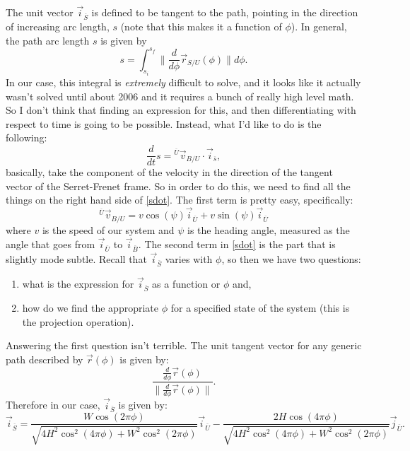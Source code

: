 \documentclass[12pt]{article}
\newcommand{\unitvec}[2]{\vec{#1}_{\overline{#2}}}
\begin{document}
The unit vector $\unitvec{i}{S}$ is defined to be tangent to the path, pointing in the direction of increasing arc length, $s$ (note that this makes it a function of $\phi$).  In general, the path arc length $s$ is given by
\begin{equation}
s=\int_{s_i}^{s_f}\| \frac{d}{d\phi}\vec{r}_{S/U}(\phi)\| d\phi.
\end{equation}
In our case, this integral is \emph{extremely} difficult to solve, and it looks like it actually wasn't solved until about 2006 and it requires a bunch of really high level math.  So I don't think that finding an expression for this, and then differentiating with respect to time is going to be possible.  Instead, what I'd like to do is the following:
\begin{equation}\label{sdot}
\frac{d}{dt}s = {}^{\overline{U}}\vec{v}_{B/U}\cdot \unitvec{i}{s},
\end{equation}
basically, take the component of the velocity in the direction of the tangent vector of the Serret-Frenet frame.  So in order to do this, we need to find all the things on the right hand side of \ref{sdot}.  The first term is pretty easy, specifically:
\begin{equation}
{}^{\overline{U}}\vec{v}_{B/U} = v \cos(\psi) \unitvec{i}{U} + v \sin(\psi) \unitvec{i}{U}
\end{equation}
where $v$ is the speed of our system and $\psi$ is the heading angle, measured as the angle that goes from $\unitvec{i}{U}$ to $\unitvec{i}{B}$.  The second term in \ref{sdot} is the part that is slightly mode subtle.  Recall that $\unitvec{i}{S}$ varies with $\phi$, so then we have two questions:
\begin{enumerate}
	\item what is the expression for $\unitvec{i}{S}$ as a function or $\phi$ and,
	\item how do we find the appropriate $\phi$ for a specified state of the system (this is the projection operation).
\end{enumerate}

Answering the first question isn't terrible.  The unit tangent vector for any generic path described by $\vec{r}(\phi)$ is given by:
\begin{equation}
\frac{\frac{d}{d\phi}\vec{r}(\phi)}{\|\frac{d}{d\phi}\vec{r}(\phi) \|}.
\end{equation}
Therefore in our case, $\unitvec{i}{S}$ is given by:
\begin{equation}
\unitvec{i}{S} = \frac{W \cos (2 \pi  \phi )}{\sqrt{4 H^2 \cos ^2(4 \pi  \phi )+W^2 \cos ^2(2 \pi  \phi )}}\unitvec{i}{U}-\frac{2 H \cos (4 \pi  \phi )}{\sqrt{4 H^2 \cos ^2(4 \pi  \phi )+W^2 \cos ^2(2 \pi  \phi )}}\unitvec{j}{U}.
\end{equation}
\end{document}
